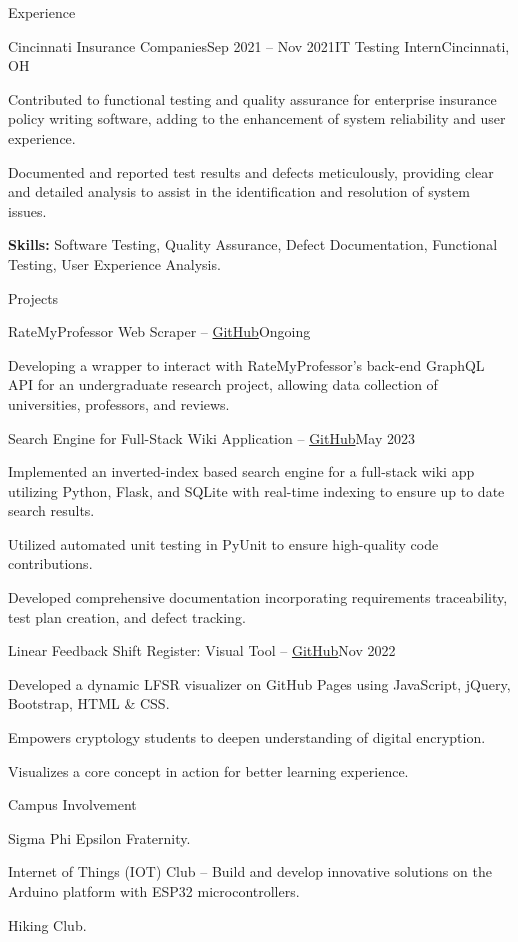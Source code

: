\documentclass[11pt]{resume}
\begin{document}
\begin{rSection}{Experience}
    \begin{rSubsection}{Cincinnati Insurance Companies}{Sep 2021 – Nov 2021}{IT Testing Intern}{Cincinnati, OH}
        \item Contributed to functional testing and quality assurance for enterprise insurance policy writing software, adding to the enhancement of system reliability and user experience.
        \item Documented and reported test results and defects meticulously, providing clear and detailed analysis to assist in the identification and resolution of system issues.
    \end{rSubsection}
    \vspace*{-5pt}
    \noindent\textbf{Skills:} Software Testing, Quality Assurance, Defect Documentation, Functional Testing, User Experience Analysis.
\end{rSection}

\begin{rSection}{Projects}

   \begin{rSubsection}{RateMyProfessor Web Scraper -- \href{https://github.com/Will-Alger/rmp-py}{GitHub}}{Ongoing}{}{}
       \item Developing a wrapper to interact with RateMyProfessor’s back-end GraphQL API for an undergraduate research project, allowing data collection of universities, professors, and reviews.
   \end{rSubsection}
   
   
   \begin{rSubsection}{Search Engine for Full-Stack Wiki Application -- \href{https://github.com/Will-Alger/Riki}{GitHub}}{May 2023}{}{}
       \item Implemented an inverted-index based search engine for a full-stack wiki app utilizing Python, Flask, and SQLite with real-time indexing to ensure up to date search results.
       \item Utilized automated unit testing in PyUnit to ensure high-quality code contributions.
       \item Developed comprehensive documentation incorporating requirements traceability, test plan creation, and defect tracking.
   \end{rSubsection}
	
    \begin{rSubsection}{Linear Feedback Shift Register: Visual Tool -- \href{https://will-alger.github.io/LFSR/}{GitHub}}{Nov 2022}{}{}
            \item Developed a dynamic LFSR visualizer on GitHub Pages using JavaScript, jQuery, Bootstrap, HTML \& CSS.
            \item Empowers cryptology students to deepen understanding of digital encryption.
            \item Visualizes a core concept in action for better learning experience.
    \end{rSubsection}
	
\end{rSection}

\begin{rSection}{Campus Involvement}
    \item Sigma Phi Epsilon Fraternity.
    \item Internet of Things (IOT) Club -- Build and develop innovative solutions on the Arduino platform with ESP32 microcontrollers.
    \item Hiking Club.
\end{rSection}
\end{document}
